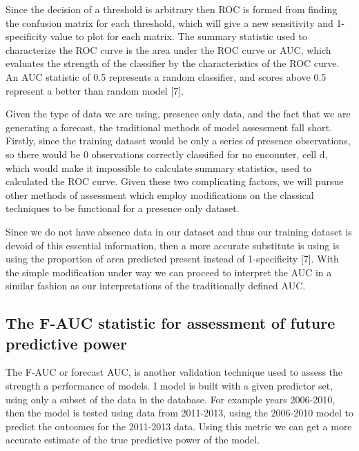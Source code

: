 \noindent Since the decision of a threshold is arbitrary then ROC is formed from finding the confusion matrix for each threshold, which will give a new sensitivity and 1-specificity value to plot for each matrix. The summary statistic used to characterize the ROC curve is the area under the ROC curve or AUC, which evaluates the strength of the classifier by the characteristics of the ROC curve. An AUC statistic of 0.5 represents a random classifier, and scores above 0.5 represent a better than random model [7].    \newline

\noindent Given the type of data we are using, presence only data, and the fact that we are generating a forecast, the traditional methods of model assessment fall short. Firstly, since the training dataset would be only a series of presence observations, so there would be 0 observations correctly classified for no encounter, cell d,  which would make it impossible to calculate summary statistics, used to calculated the ROC curve. Given these two complicating factors, we will pursue other methods of assessment which employ modifications on the classical techniques to be functional for a presence only dataset.  \newline

\noindent Since we do not have absence data in our dataset and thus our training dataset is devoid of this essential information, then a more accurate substitute is using is using the proportion of area predicted present instead of 1-specificity [7]. With the simple modification under way we can proceed to interpret the AUC in a similar fashion as our interpretations of the traditionally defined AUC.  \newline


\subsection{The F-AUC statistic for assessment of future predictive power }

The F-AUC or forecast AUC, is another validation technique used to assess the strength a performance of models. I model is built with a given predictor set, using only a subset of the data in the database. For example years 2006-2010, then the model is tested using data from 2011-2013, using the 2006-2010 model to predict the outcomes for the 2011-2013 data. Using this metric we can get a more accurate estimate of the true predictive power of the model. 

